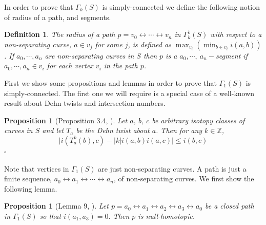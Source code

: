 \documentclass[11pt]{article}
\def\l{\left}
\def\r{\right}
\def\lr{\leftrightarrow}
\def\Z{\mathbb{Z}}
\newtheorem{definition}[theorem]{Definition}
\newtheorem{proposition}[theorem]{Proposition}
\begin{document}
In order to prove that $\Gamma_k(S)$ is simply-connected we define the following notion of radius of a path, and segments.
\begin{definition}
  The radius of a path $p = v_0 \lr \cdots \lr v_n$ in $\Gamma^1_k(S)$ with respect to a non-separating curve, $a\in v_j$ for some $j$, is defined as $\max_{v_i}\l(\min_{b\in v_i}i(a,b)\r)$. If $a_0,\cdots, a_n$ are non-separating curves in $S$ then $p$ is a $a_0,\cdots,\ a_n-$segment if $a_0,\cdots,a_n\in v_i$ for each vertex $v_i$ in the path $p$.
\end{definition}
First we show some propositions and lemmas in order to prove that $\Gamma_1(S)$ is simply-connected. The first one we will require is a special case of a well-known result about Dehn twists and intersection numbers.
\begin{proposition}[Proposition 3.4, \cite{farb}]\label{prop:dehn-int}
  Let $a,\ b,\ c$ be arbitrary isotopy classes of curves in $S$ and let $T_a$ be the Dehn twist about $a$. Then for any $k\in \Z$,
  $$\bigg| i(T_a^{k}(b), c) - |k| i(a,b)i(a,c) \bigg| \leq i(b,c)$$
$\square$
\end{proposition}
Note that vertices in $\Gamma_1(S)$ are just non-separating curves. A path is just a finite sequence, $a_0\lr a_1\lr \cdots \lr a_n$, of non-separating curves. We first show the following lemma.
\begin{proposition}[Lemma 9, \cite{wajnryb}]\label{prop:four-cycles}
  Let $p = a_0\lr a_1\lr a_2\lr a_3 \lr a_0$ be a closed path in $\Gamma_1(S)$ so that $i(a_1,a_3)=0$. Then $p$ is null-homotopic.
\end{proposition}
\end{document}
